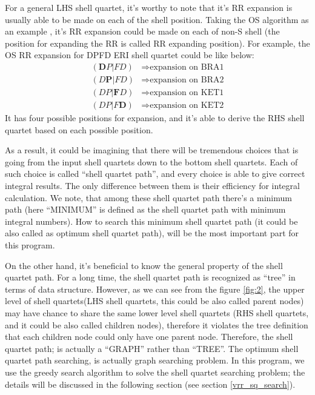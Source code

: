 For a general LHS shell quartet, it's worthy to note that 
it's RR expansion is usually able to be made on each of 
the shell position. Taking the OS algorithm as an example
\cite{OS1986}, it's RR expansion could be made on each of non-S
shell (the position for expanding the RR is called RR expanding 
position). For example, the OS RR expansion for DPFD ERI shell quartet
could be like below:
\begin{align}
 (\bm{D}P|FD) &\Rightarrow \text{expansion on BRA1} \nonumber \\
 (D\bm{P}|FD) &\Rightarrow \text{expansion on BRA2} \nonumber \\
 (DP|\bm{F}D) &\Rightarrow \text{expansion on KET1} \nonumber \\
 (DP|F\bm{D}) &\Rightarrow \text{expansion on KET2}
\end{align}
It has four possible positions for expansion, and it's able to 
derive the RHS shell quartet based on each possible position.

As a result, it could be imagining that there will be tremendous
choices that is going from the input shell quartets down to the 
bottom shell quartets. Each of such choice is called ``shell quartet 
path'', and every choice is able to give correct integral results.
The only difference between them is their efficiency for integral calculation. 
We note, that among these shell quartet path there's a minimum 
path (here ``MINIMUM'' is defined as the shell quartet path with
minimum integral numbers). How to search this minimum shell quartet
path (it could be also called as optimum shell quartet path), 
will be the most important part for this program.

On the other hand, it's beneficial to know the general property
of the shell quartet path. For a long time, the shell quartet path
is recognized as ``tree'' in terms of data structure\cite{HGP}. However, as 
we can see from the figure \ref{fig:2}, the upper level of shell 
quartets(LHS shell quartets, this could be also called parent nodes) 
may have chance to share the same lower level shell quartets (RHS shell quartets,
and it could be also called children nodes), therefore it violates
the tree definition that each children node could only have one 
parent node. Therefore, the shell quartet path; is actually a ``GRAPH''
rather than ``TREE''. The optimum shell quartet path searching,
is actually graph searching problem. In this program, we use 
the greedy search algorithm to solve the shell quartet searching
problem; the details will be discussed in the following section (see 
section \ref{vrr_sq_search}).

